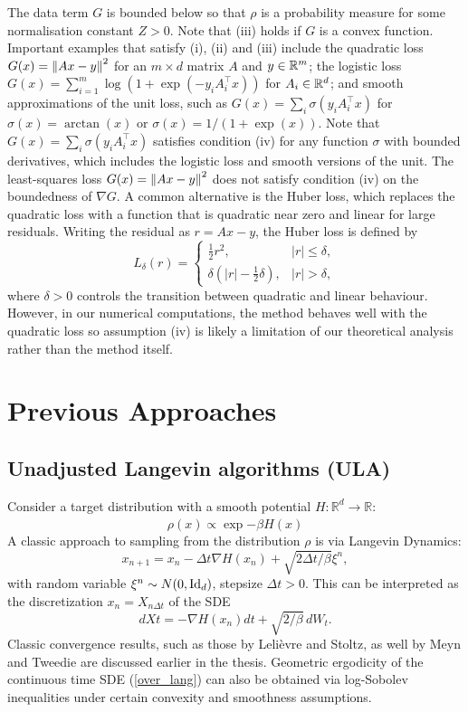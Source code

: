 \documentclass[11pt, twoside]{report}
\begin{document}
The data term $G$ is bounded below so that $\rho$ is a probability measure for some normalisation constant $Z>0$. Note that (iii) holds if $G$ is a convex function. Important examples that satisfy (i), (ii) and (iii) include the quadratic loss $G(x) = \left\lVert A x - y\right\rVert^2$ for an $m\times d$ matrix $A$ and $y\in \mathbb{R}^m$; the logistic loss $G(x)=\sum_{i=1}^m \log( 1+ \exp(-y_i A_i^\top x) )$ for $A_i\in\mathbb{R}^d$; and smooth approximations of the unit loss,  such as $G(x) = \sum_i \sigma(y_i A_i^\top x)$ for $\sigma(x)=\arctan(x)$ or $\sigma(x)=1/(1+\exp(x))$.
Note that  $G(x) = \sum_i \sigma(y_i A_i^\top x)$  satisfies condition (iv) for any function $\sigma$ with bounded derivatives, which includes the logistic loss and smooth versions of the unit.  The least-squares loss $G(x)=\left\lVert Ax-y\right\rVert^2$ does not satisfy condition
(iv) on the boundedness of $\nabla G$. A common alternative is the Huber loss, which replaces the quadratic loss with a function that
is quadratic near zero and linear for large residuals. Writing the residual as $r = Ax - y$, the Huber loss is defined by
\[
L_\delta(r) =
\begin{cases}
\frac{1}{2} r^2, & |r| \le \delta, \\
\delta\left(|r| - \frac{1}{2}\delta\right), & |r| > \delta,
\end{cases}
\]
where $\delta>0$ controls the transition between quadratic and linear behaviour. However, in our numerical computations, the method behaves well with the quadratic loss so assumption (iv) is likely a limitation of our theoretical analysis rather than the method itself.
\section{Previous Approaches}
\subsection{Unadjusted Langevin algorithms (ULA)}
Consider a target distribution with a smooth potential $H: \mathbb{R}^d \xrightarrow[]{} \mathbb{R}$:
\begin{equation} \label{smoothdist}
    \rho(x) \propto \exp{-\beta H(x)}
\end{equation}
A classic approach to sampling from the distribution $\rho$ is via Langevin Dynamics:
\begin{equation}
    x_{n+1} = x_n - \Delta t\nabla H(x_n) + \sqrt{2\Delta t/\beta} \xi^n,
\end{equation}
with random variable $\xi^n \sim N(0,\mathrm{Id}_d)$, stepsize $\Delta t >0$. This can be interpreted as the discretization $x_n = X_{n \Delta t}$ of the SDE
\begin{equation} \label{over_lang}
    dXt = -\nabla H(x_n) dt + \sqrt{2/\beta} \, dW_t.
\end{equation}
Classic convergence results, such as those by Leli{\`e}vre and Stoltz, as well by Meyn and Tweedie \cite{meyn2012-oq} are discussed earlier in the thesis. Geometric ergodicity of the continuous time SDE (\ref{over_lang}) can also be obtained via log-Sobolev inequalities under certain convexity and smoothness assumptions.
\end{document}
